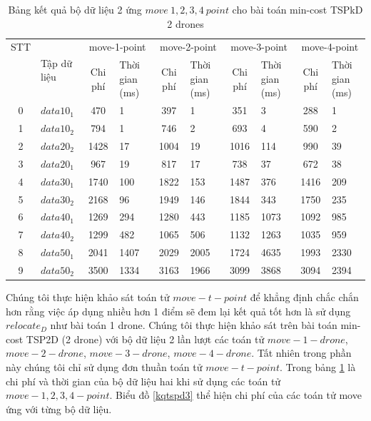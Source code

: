 \documentclass[a4paper,12pt]{report}
\begin{document}
\begin{longtable}{|c|l|c|p{1.5cm}|c|p{1cm}|c|p{1cm}|c|p{1cm}|}
\caption{Bảng kết quả bộ dữ liệu 2 ứng $move \ 1, 2, 3, 4 \ point$ cho bài toán min-cost TSPkD 2 drones}
\label{tabletspkd3}\\ 
\toprule
STT&\multirow{2}{*}{Tập dữ liệu} & \multicolumn{2}{c|}{move-1-point } &\multicolumn{2}{c|}{move-2-point } &\multicolumn{2}{c|}{move-3-point }&\multicolumn{2}{c|}{move-4-point } \\
\cline{3-10} 
&&Chi phí &Thời gian (ms)&Chi phí &Thời gian (ms)&Chi phí &Thời gian (ms)&Chi phí &Thời gian (ms)\\
\midrule
        \toprule
0&$data 10_1$&470& 1&
397& 1&
351 &3&
288& 1\\
\hline
1&$data 10_2$&794& 1&
746& 2&
693 &4&
590& 2 \\
\hline
2&$data 20_2$&1428 &17&
1004&  19&
1016& 114&
990& 39 \\
\hline
3&$data 20_1$&967& 19 &
817 &17&
738& 37&
672& 38\\
\hline
4&$data 30_1$&1740 &100&
1822& 153&
1487 &376&
1416& 209 \\
\hline

5&$data 30_2$&2168& 96&
1949& 146&
1844 &343&
1750 &235 \\
\hline
6&$data 40_1$&1269 & 294&
1280& 443&
1185& 1073&
1092& 985 \\
\hline
7&$data 40_2$&1299 & 482&
1065& 506&
1132 &1263&
1035 &959 \\
\hline
8&$data 50_1$&2041 &1407&
2029 &2005 &
1724 &4635 &
1993 & 2330\\
\hline
9&$data 50_2$ & 3500 & 1334 &
3163 & 1966 &
3099 & 3868 &
3094 & 2394\\
\hline

\end{longtable}
\normalsize
Chúng tôi thực hiện khảo sát toán tử $move-t-point$ để khẳng định chắc chắn hơn rằng việc áp dụng nhiều hơn 1 điểm sẽ đem lại kết quả tốt hơn  là sử dụng $relocate_D$ như bài toán 1 drone. Chúng tôi thực hiện khảo sát trên bài toán min-cost TSP2D (2 drone) với bộ dữ liệu 2 lần lượt các toán tử $move-1-drone$, $move-2-drone$, $move-3-drone$, $move-4-drone$. Tất nhiên trong phần này chúng tôi chỉ sử dụng đơn thuần toán tử $move-t-point$.
Trong bảng \ref{tabletspkd3} là chi phí và thời gian của bộ dữ liệu hai khi sử dụng các toán tử $move- 1, 2, 3, 4 -point$. Biểu đồ \ref{kqtspd3} thể hiện chi phí của các toán tử move ứng với từng bộ dữ liệu. \\
\end{document}
